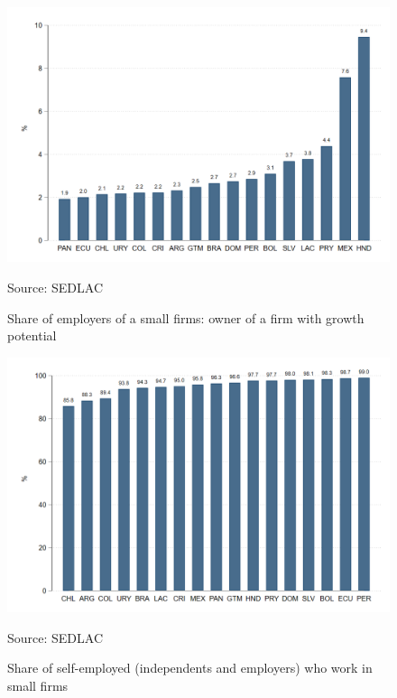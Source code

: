 \documentclass[english]{article}
\begin{document}
\begin{figure}[H]
            \justifying
                \caption{Share of employers of a small firms: owner of a firm with growth potential}  
            \centerline{\includegraphics[scale=.3]{latex/figures/Self-employed/employer_growthfirms.png}}
                \label{fig:owner}
                \footnotesize{Source: SEDLAC}
\end{figure}

\begin{figure}[H]
            \justifying
                \caption{Share of self-employed (independents and employers) who work in small firms}  
            \centerline{\includegraphics[scale=.3]{latex/figures/Self-employed/selfemployed_small.png}}
                \label{fig:se-small}
                \footnotesize{Source: SEDLAC}
\end{figure}
\end{document}
